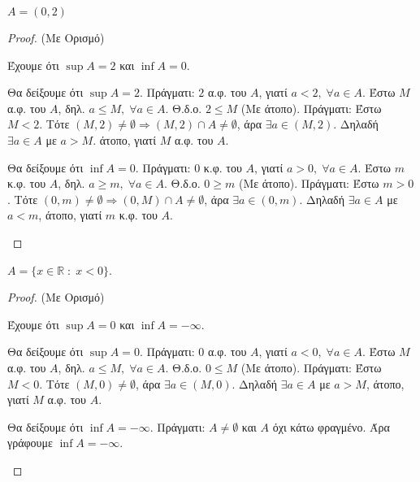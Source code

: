 \begin{enumerate}
      \item {\boldmath\textcolor{Col2}{$A = (0,2) $}}
        \begin{proof}(Με Ορισμό)
        \item {}
          Έχουμε ότι $ \sup A = 2 $ και $ \inf A = 0 $.
          \begin{myitemize}
            \item Θα δείξουμε ότι $ \sup A = 2 $. Πράγματι:
              $2$ α.φ. του $A$, γιατί $ a < 2, \; \forall a \in A $.
              Έστω $M$ α.φ. του $A$, δηλ. $a \leq M, \; \forall a \in A $.
              Θ.δ.ο. $ 2 \leq M $ (Με άτοπο). Πράγματι:
              Έστω $ M < 2 $. Τότε $ (M,2) \neq \emptyset \Rightarrow (M,2) \cap A \neq
              \emptyset $, άρα 
              $ \exists a \in (M,2) $.
              Δηλαδή $ \exists a \in A $ με $ a > M $. 
              άτοπο, γιατί $ M $ α.φ. του $A$.
            \item Θα δείξουμε ότι $ \inf A = 0 $. Πράγματι:
              $0$ κ.φ. του $A$, γιατί $ a > 0, \; \forall a \in A $.
              Έστω $m$ κ.φ. του $A$, δηλ. $a \geq m, \; \forall a \in A $.
              Θ.δ.ο. $ 0 \geq m $ (Με άτοπο). Πράγματι:
              Έστω $ m > 0 $. Τότε $ (0,m) \neq \emptyset \Rightarrow (0,M) \cap A \neq
              \emptyset $, άρα 
              $ \exists a \in (0,m) $. 
              Δηλαδή $ \exists a \in A $ με $ a < m $, 
              άτοπο, γιατί $ m $ κ.φ. του $A$.
          \end{myitemize}
        \end{proof}
      \item {\boldmath\textcolor{Col2}{$ A = \{ x \in \mathbb{R} \; 
        : \; x < 0 \} $}}. 
        \begin{proof}(Με Ορισμό)
        \item {}
          Έχουμε ότι $ \sup A = 0 $ και $ \inf A = - \infty $.
          \begin{myitemize}
            \item Θα δείξουμε ότι $ \sup A = 0 $. Πράγματι:
              $ 0 $ α.φ. του $A$, γιατί $ a < 0, \; \forall a \in A $.
              Έστω $M$ α.φ. του $A$, δηλ. $a \leq M, \; \forall a \in A $.
              Θ.δ.ο. $ 0 \leq M $ (Με άτοπο). Πράγματι:
              Έστω $ M < 0 $. Τότε $ (M,0) \neq \emptyset $, άρα 
              $ \exists a \in (M,0) $.
              Δηλαδή $ \exists a \in A $ με $ a > M $, 
              άτοπο, γιατί $ M $ α.φ. του $A$.
            \item Θα δείξουμε ότι $ \inf A = -\infty $. Πράγματι:
              $ A \neq \emptyset $ και $A$ όχι κάτω φραγμένο. Άρα γράφουμε
              $ \inf A = - \infty $.
          \end{myitemize}
        \end{proof}


\end{enumerate}
